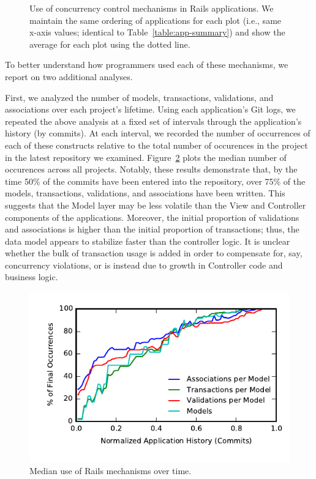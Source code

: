 \begin{figure}
\caption{Use of concurrency control mechanisms in Rails
  applications. We maintain the same ordering of applications for each
  plot (i.e., same x-axis values; identical to
  Table~\ref{table:app-summary}) and show the average for each plot
  using the dotted line.}
\label{fig:usages}
\end{figure}



 To better understand how programmers
used each of these mechanisms, we report on two additional
analyses.

First, we analyzed the number of models, transactions, validations,
and associations over each project's lifetime. Using each
application's Git logs, we repeated the above analysis at a fixed set
of intervals through the application's history (by commits). At each
interval, we recorded the number of occurrences of each of these
constructs relative to the total number of occurences in the project
in the latest repository we examined. Figure~\ref{fig:historical}
plots the median number of occurences across all projects. Notably,
these results demonstrate that, by the time 50\% of the commits have
been entered into the repository, over 75\% of the models,
transactions, validations, and associations have been written. This
suggests that the Model layer may be less volatile than the View and
Controller components of the applications. Moreover, the initial
proportion of validations and associations is higher than the initial
proportion of transactions; thus, the data model appears to stabilize
faster than the controller logic. It is unclear whether the bulk of
transaction usage is added in order to compensate for, say,
concurrency violations, or is instead due to growth in Controller code
and business logic.

\begin{figure}
\includegraphics[width=\columnwidth]{figs/historical-median.pdf}\vspace{-2em}
\caption{Median use of Rails mechanisms over time.}
\label{fig:historical}
\end{figure}

